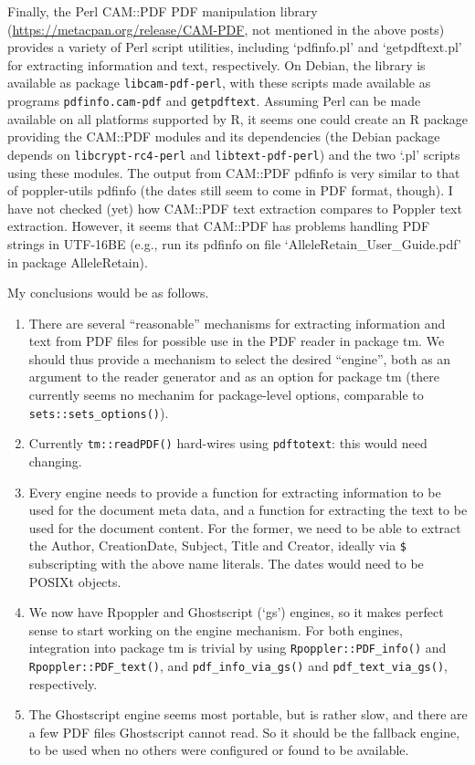\documentclass[a4paper]{article}
\newcommand{\file}[1]{`\textsf{#1}'}
\newcommand{\strong}[1]{{\normalfont\fontseries{b}\selectfont #1}}
\let\pkg=\strong
\begin{document}
Finally, the Perl CAM::PDF PDF manipulation library
(\url{https://metacpan.org/release/CAM-PDF}, not mentioned in the above
posts) provides a variety of Perl script utilities, including
\file{pdfinfo.pl} and \file{getpdftext.pl} for extracting information
and text, respectively.  On Debian, the library is available as package
\verb|libcam-pdf-perl|, with these scripts made available as programs
\verb|pdfinfo.cam-pdf| and \verb|getpdftext|.  Assuming Perl can be made
available on all platforms supported by R, it seems one could create an
R package providing the CAM::PDF modules and its dependencies (the
Debian package depends on \verb|libcrypt-rc4-perl| and
\verb|libtext-pdf-perl|) and the two \file{.pl} scripts using these
modules.  The output from CAM::PDF pdfinfo is very similar to that of
poppler-utils pdfinfo (the dates still seem to come in PDF format,
though).  I have not checked (yet) how CAM::PDF text extraction compares
to Poppler text extraction.  However, it seems that CAM::PDF has
problems handling PDF strings in UTF-16BE (e.g., run its pdfinfo on file
\file{AlleleRetain\_User\_Guide.pdf} in package \pkg{AlleleRetain}).

My conclusions would be as follows.
\begin{enumerate}
 \item There are several ``reasonable'' mechanisms for extracting
  information and text from PDF files for possible use in the PDF reader
  in package \pkg{tm}.  We should thus provide a mechanism to select the
  desired ``engine'', both as an argument to the reader generator and as
  an option for package \pkg{tm} (there currently seems no mechanim for
  package-level options, comparable to \verb|sets::sets_options()|).

 \item Currently \verb|tm::readPDF()| hard-wires using \verb|pdftotext|:
  this would need changing.

 \item Every engine needs to provide a function for extracting
  information to be used for the document meta data, and a function for
  extracting the text to be used for the document content.  For the
  former, we need to be able to extract the Author, CreationDate,
  Subject, Title and Creator, ideally via \verb|$| subscripting with the
  above name literals.  The dates would need to be POSIXt objects.

 \item We now have Rpoppler and Ghostscript (`gs') engines, so it makes
  perfect sense to start working on the engine mechanism.  For both
  engines, integration into package \pkg{tm} is trivial by using
  \verb|Rpoppler::PDF_info()| and \verb|Rpoppler::PDF_text()|, and
  \verb|pdf_info_via_gs()| and \verb|pdf_text_via_gs()|, respectively.

 \item The Ghostscript engine seems most portable, but is rather slow,
  and there are a few PDF files Ghostscript cannot read.  So it should
  be the fallback engine, to be used when no others were configured or
  found to be available.
\end{enumerate}
\end{document}
